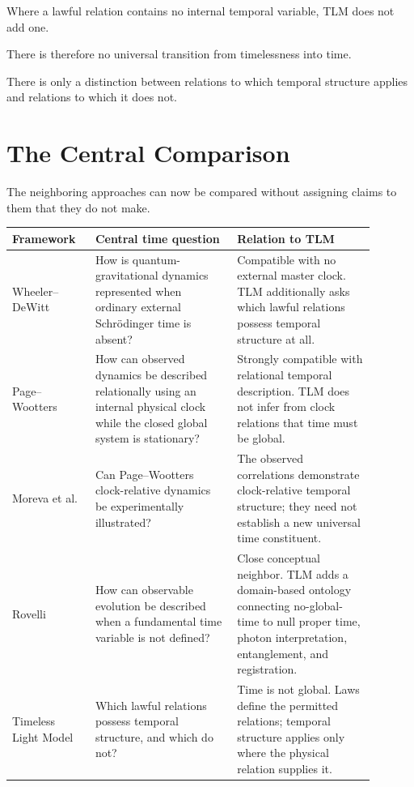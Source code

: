 \documentclass[12pt,onecolumn]{article}
\theoremstyle{plain}
\theoremstyle{definition}
\theoremstyle{remark}
\begin{document}
Where a lawful relation contains no internal temporal variable, TLM does
not add one.

There is therefore no universal transition from timelessness into time.

There is only a distinction between relations to which temporal structure
applies and relations to which it does not.

\section{The Central Comparison}

The neighboring approaches can now be compared without assigning claims to
them that they do not make.

\begin{center}
\begin{tabular}{p{0.20\linewidth}p{0.35\linewidth}p{0.34\linewidth}}
\hline
\textbf{Framework} &
\textbf{Central time question} &
\textbf{Relation to TLM}
\\
\hline

Wheeler--DeWitt &
How is quantum-gravitational dynamics represented when ordinary external
Schr\"odinger time is absent? &
Compatible with no external master clock. TLM additionally asks which
lawful relations possess temporal structure at all.
\\[0.8em]

Page--Wootters &
How can observed dynamics be described relationally using an internal
physical clock while the closed global system is stationary? &
Strongly compatible with relational temporal description. TLM does not
infer from clock relations that time must be global.
\\[0.8em]

Moreva et al. &
Can Page--Wootters clock-relative dynamics be experimentally illustrated? &
The observed correlations demonstrate clock-relative temporal structure;
they need not establish a new universal time constituent.
\\[0.8em]

Rovelli &
How can observable evolution be described when a fundamental time variable
is not defined? &
Close conceptual neighbor. TLM adds a domain-based ontology connecting
no-global-time to null proper time, photon interpretation, entanglement,
and registration.
\\[0.8em]

Timeless Light Model &
Which lawful relations possess temporal structure, and which do not? &
Time is not global. Laws define the permitted relations; temporal structure
applies only where the physical relation supplies it.
\\

\hline
\end{tabular}
\end{center}
\end{document}
